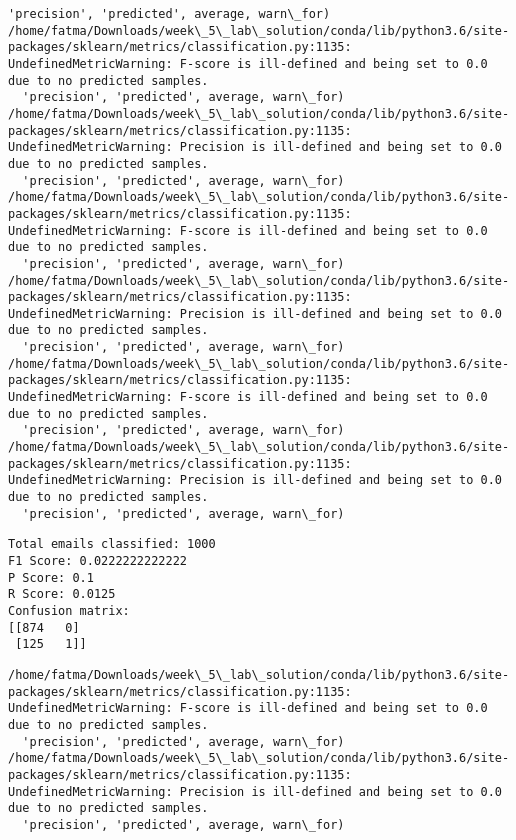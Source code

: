 \documentclass[11pt]{article}
\begin{document}
\begin{Verbatim}[commandchars=\\\{\}]
  'precision', 'predicted', average, warn\_for)
/home/fatma/Downloads/week\_5\_lab\_solution/conda/lib/python3.6/site-packages/sklearn/metrics/classification.py:1135: UndefinedMetricWarning: F-score is ill-defined and being set to 0.0 due to no predicted samples.
  'precision', 'predicted', average, warn\_for)
/home/fatma/Downloads/week\_5\_lab\_solution/conda/lib/python3.6/site-packages/sklearn/metrics/classification.py:1135: UndefinedMetricWarning: Precision is ill-defined and being set to 0.0 due to no predicted samples.
  'precision', 'predicted', average, warn\_for)
/home/fatma/Downloads/week\_5\_lab\_solution/conda/lib/python3.6/site-packages/sklearn/metrics/classification.py:1135: UndefinedMetricWarning: F-score is ill-defined and being set to 0.0 due to no predicted samples.
  'precision', 'predicted', average, warn\_for)
/home/fatma/Downloads/week\_5\_lab\_solution/conda/lib/python3.6/site-packages/sklearn/metrics/classification.py:1135: UndefinedMetricWarning: Precision is ill-defined and being set to 0.0 due to no predicted samples.
  'precision', 'predicted', average, warn\_for)
/home/fatma/Downloads/week\_5\_lab\_solution/conda/lib/python3.6/site-packages/sklearn/metrics/classification.py:1135: UndefinedMetricWarning: F-score is ill-defined and being set to 0.0 due to no predicted samples.
  'precision', 'predicted', average, warn\_for)
/home/fatma/Downloads/week\_5\_lab\_solution/conda/lib/python3.6/site-packages/sklearn/metrics/classification.py:1135: UndefinedMetricWarning: Precision is ill-defined and being set to 0.0 due to no predicted samples.
  'precision', 'predicted', average, warn\_for)

    \end{Verbatim}

    \begin{Verbatim}[commandchars=\\\{\}]
Total emails classified: 1000
F1 Score: 0.0222222222222
P Score: 0.1
R Score: 0.0125
Confusion matrix:
[[874   0]
 [125   1]]

    \end{Verbatim}

    \begin{Verbatim}[commandchars=\\\{\}]
/home/fatma/Downloads/week\_5\_lab\_solution/conda/lib/python3.6/site-packages/sklearn/metrics/classification.py:1135: UndefinedMetricWarning: F-score is ill-defined and being set to 0.0 due to no predicted samples.
  'precision', 'predicted', average, warn\_for)
/home/fatma/Downloads/week\_5\_lab\_solution/conda/lib/python3.6/site-packages/sklearn/metrics/classification.py:1135: UndefinedMetricWarning: Precision is ill-defined and being set to 0.0 due to no predicted samples.
  'precision', 'predicted', average, warn\_for)

    \end{Verbatim}
\end{document}
